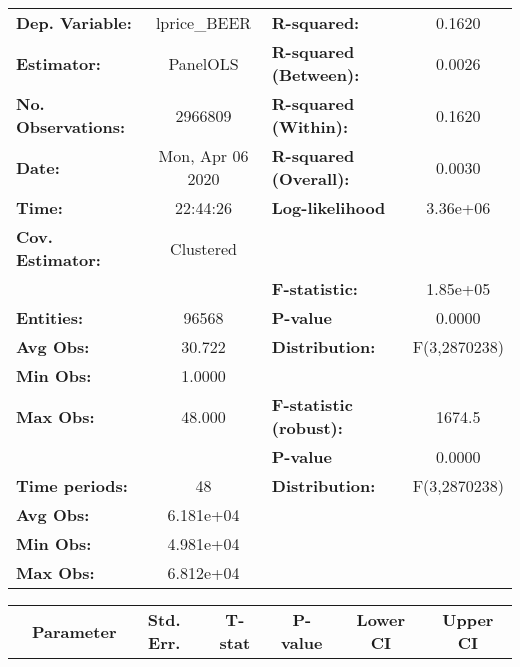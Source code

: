 \documentclass{report}
\begin{document}
\begin{center}
\begin{tabular}{lclc}
\toprule
\textbf{Dep. Variable:}    &    lprice\_BEER    & \textbf{  R-squared:         }   &      0.1620      \\
\textbf{Estimator:}        &      PanelOLS      & \textbf{  R-squared (Between):}  &      0.0026      \\
\textbf{No. Observations:} &      2966809       & \textbf{  R-squared (Within):}   &      0.1620      \\
\textbf{Date:}             &  Mon, Apr 06 2020  & \textbf{  R-squared (Overall):}  &      0.0030      \\
\textbf{Time:}             &      22:44:26      & \textbf{  Log-likelihood     }   &     3.36e+06     \\
\textbf{Cov. Estimator:}   &     Clustered      & \textbf{                     }   &                  \\
\textbf{}                  &                    & \textbf{  F-statistic:       }   &     1.85e+05     \\
\textbf{Entities:}         &       96568        & \textbf{  P-value            }   &      0.0000      \\
\textbf{Avg Obs:}          &       30.722       & \textbf{  Distribution:      }   &   F(3,2870238)   \\
\textbf{Min Obs:}          &       1.0000       & \textbf{                     }   &                  \\
\textbf{Max Obs:}          &       48.000       & \textbf{  F-statistic (robust):} &      1674.5      \\
\textbf{}                  &                    & \textbf{  P-value            }   &      0.0000      \\
\textbf{Time periods:}     &         48         & \textbf{  Distribution:      }   &   F(3,2870238)   \\
\textbf{Avg Obs:}          &     6.181e+04      & \textbf{                     }   &                  \\
\textbf{Min Obs:}          &     4.981e+04      & \textbf{                     }   &                  \\
\textbf{Max Obs:}          &     6.812e+04      & \textbf{                     }   &                  \\
\bottomrule
\end{tabular}
\begin{tabular}{lcccccc}
                           & \textbf{Parameter} & \textbf{Std. Err.} & \textbf{T-stat} & \textbf{P-value} & \textbf{Lower CI} & \textbf{Upper CI}  \\

\end{tabular}
\end{center}
\end{document}
